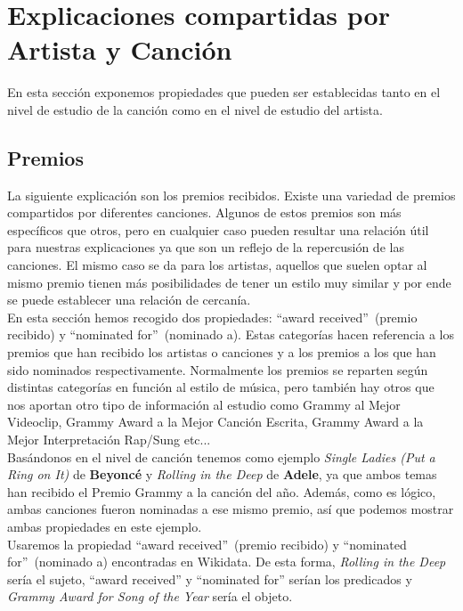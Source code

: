 \section{Explicaciones compartidas por Artista y Canción}

En esta sección exponemos propiedades que pueden ser establecidas tanto en el nivel de estudio de la canción como en el nivel de estudio del artista.

\subsection*{Premios}

La siguiente explicación son los premios recibidos. Existe una variedad de premios compartidos por diferentes canciones. Algunos de estos premios son más específicos que otros, pero en cualquier caso pueden resultar una relación útil para nuestras explicaciones ya que son un reflejo de la repercusión de las canciones. El mismo caso se da para los artistas, aquellos que suelen optar al mismo premio tienen más posibilidades de tener un estilo muy similar y por ende se puede establecer una relación de cercanía.\\

En esta sección hemos recogido dos propiedades: ``award received''~(premio recibido) y ``nominated for''~(nominado a). Estas categorías hacen referencia a los premios que han recibido los artistas o canciones y a los premios a los que han sido nominados respectivamente. Normalmente los premios se reparten según distintas categorías en función al estilo de música, pero también hay otros que nos aportan otro tipo de información al estudio como Grammy al Mejor Videoclip, Grammy Award a la Mejor Canción Escrita, Grammy Award a la Mejor Interpretación Rap/Sung etc...\\

Basándonos en el nivel de canción tenemos como ejemplo \textit{Single Ladies (Put a Ring on It)} de \textbf{Beyoncé} y \textit{Rolling in the Deep} de \textbf{Adele}, ya que ambos temas han recibido el Premio Grammy a la canción del año. Además, como es lógico, ambas canciones fueron nominadas a ese mismo premio, así que podemos mostrar ambas propiedades en este ejemplo.\\

Usaremos la propiedad ``award received''~(premio recibido) y ``nominated for''~(nominado a) encontradas en Wikidata. De esta forma, \textit{Rolling in the Deep} sería el sujeto, ``award received'' y ``nominated for'' serían los predicados y \textit{Grammy Award for Song of the Year} sería el objeto.\\

